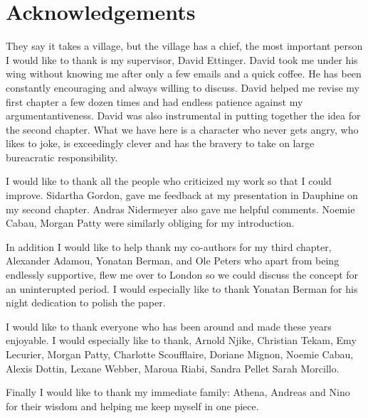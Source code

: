 \documentclass[12pt,twoside]{report}
\numberwithin{equation}{section}
\begin{document}


 
 
\chapter*{Acknowledgements}
They say it takes a village, but the village has a chief, the most important person I would like to thank is my supervisor, David Ettinger. David took me under his wing without knowing me after only a few emails and a quick coffee. He has been constantly encouraging and always willing to discuss. David helped me revise my first chapter a few dozen times and had endless patience against my argumentantiveness. David was also instrumental in putting together the idea for the second chapter. What we have here is a character who never gets angry, who likes to joke, is exceedingly clever and has the bravery to take on large bureacratic responsibility. 

I would like to thank all the people who criticized my work so that I could improve. Sidartha Gordon, gave me feedback at my presentation in Dauphine on my second chapter. Andras Nidermeyer also gave me helpful comments. Noemie Cabau, Morgan Patty were similarly obliging for my introduction. 

In addition I would like to help thank my co-authors for my third chapter, Alexander Adamou, Yonatan Berman, and Ole Peters who apart from being endlessly supportive, flew me over to London so we could discuss the concept for an uninterupted period. I would especially like to thank Yonatan Berman for his night dedication to polish the paper.

I would like to thank everyone who has been around and made these years enjoyable. I would especially like to thank, Arnold Njike, Christian Tekam, Emy Lecurier, Morgan Patty, Charlotte Scoufflaire, Doriane Mignon, Noemie Cabau, Alexis Dottin, Lexane Webber,  Maroua Riabi, Sandra Pellet Sarah Morcillo. 

Finally I would like to thank my immediate family: Athena, Andreas and Nino for their wisdom and helping me keep myself in one piece. 
\end{document}
